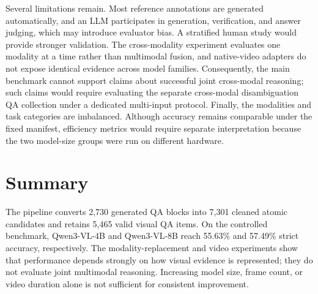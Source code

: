 Several limitations remain. Most reference annotations are generated
automatically, and an LLM participates in generation, verification, and answer
judging, which may introduce evaluator bias. A stratified human study would
provide stronger validation. The cross-modality experiment evaluates one
modality at a time rather than multimodal fusion, and native-video adapters do
not expose identical evidence across model families. Consequently, the main
benchmark cannot support claims about successful joint cross-modal reasoning;
such claims would require evaluating the separate cross-modal disambiguation
QA collection under a dedicated multi-input protocol. Finally, the modalities
and task categories are imbalanced. Although accuracy remains comparable under
the fixed manifest, efficiency metrics would require separate interpretation
because the two model-size groups were run on different hardware.


\section{Summary}
\label{sec:evaluation_summary}

The pipeline converts 2,730 generated QA blocks into 7,301 cleaned atomic
candidates and retains 5,465 valid visual QA items. On the controlled benchmark, Qwen3-VL-4B and Qwen3-VL-8B reach 55.63\% and
57.49\% strict accuracy, respectively. The modality-replacement and video
experiments show that performance depends strongly on how visual evidence is
represented; they do not evaluate joint multimodal reasoning. Increasing model
size, frame count, or video duration alone is not sufficient for consistent
improvement.
